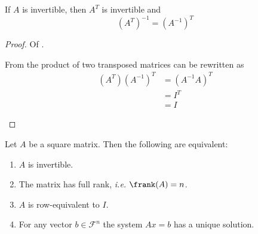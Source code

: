 \begin{thm}\label{thm-transposed-inverse-matrix}
	If $A$ is invertible, then $A^T$ is invertible and
	\begin{equation}
		(A^T)^{-1}=(A^{-1})^T
	\end{equation}
\end{thm}

\begin{proof}
	Of .
	\begin{flushleft}
		From  the product of two transposed
		matrices can be rewritten as
		\begin{align*}
			(A^T)(A^{-1})^T & =(A^{-1}A)^T \\
			                & =I^T         \\
			                & =I
		\end{align*}
	\end{flushleft}
\end{proof}

\begin{thm}\label{thm-square-matrix-properties}
	Let $A$ be a square matrix. Then the following are equivalent:
	\begin{enumerate}
		\item $A$ is invertible.
		\item The matrix has full rank, \textit{i.e.} $\frank(A)=n$.
		\item $A$ is row-equivalent to $I$.
		\item For any vector $b\in\mathcal{F}^n$ the system $Ax=b$ has a unique solution.
	\end{enumerate}
\end{thm}

